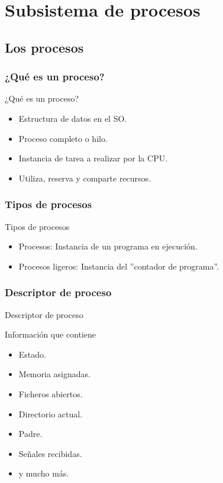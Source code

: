 \section{Subsistema de procesos}
\subsection{Los procesos}
\subsubsection{¿Qué es un proceso?}
\begin{frame}{¿Qué es un proceso?}
	\begin{itemize}
		\item Estructura de datos en el SO.
		\item Proceso completo o hilo.
		\item Instancia de tarea a realizar por la CPU.
		\item Utiliza, reserva y comparte recursos.
	\end{itemize}
\end{frame}

\subsubsection{Tipos de procesos}
\begin{frame}{Tipos de procesos}
	\begin{itemize}
		\item Procesos: Instancia de un programa en ejecución.
		\item Procesos ligeros: Instancia del ''contador de programa''.
	\end{itemize}
\end{frame}

\subsubsection{Descriptor de proceso}
\begin{frame}{Descriptor de proceso}
	\begin{block}{Información que contiene}
		\begin{itemize}
			\item Estado.
			\item Memoria asignadas.
			\item Ficheros abiertos.
			\item Directorio actual.
			\item Padre.
			\item Señales recibidas.
			\item y mucho más.
		\end{itemize}
	\end{block}
\end{frame}

